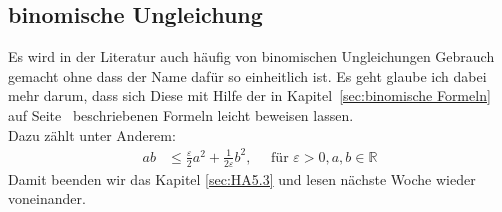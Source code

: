 \documentclass[a4paper]{article}
\newcommand{\R}{\mathbb{R}}
\begin{document}
\subsection{binomische Ungleichung}
\label{sec:binom Ungl}
Es wird in der Literatur auch häufig von binomischen Ungleichungen Gebrauch gemacht ohne dass der Name dafür so einheitlich ist. Es geht glaube ich dabei mehr darum, dass sich Diese mit Hilfe der in Kapitel~\ref{sec:binomische Formeln} auf Seite~\pageref{sec:binomische Formeln} beschriebenen Formeln leicht beweisen lassen. \\
Dazu zählt unter Anderem:
\begin{align}
ab &\leq \frac{\varepsilon}{2} a^2 + \frac{1}{2 \varepsilon} b^2, \quad \text{ für } \varepsilon > 0, a,b \in \R \label{eq:binomungl}
\end{align}
Damit beenden wir das Kapitel \ref{sec:HA5.3} und lesen nächste Woche wieder voneinander.
\end{document}

